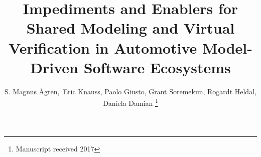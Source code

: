 \documentclass[10pt,journal,compsoc,letterpaper]{IEEEtran}
\begin{document}
%
\title{Impediments and Enablers for Shared Modeling and Virtual Verification in Automotive Model-Driven Software Ecosystems}
%
%
%

\author{S. Magnus Ågren,~Eric Knauss, Paolo Giusto, Grant Soremekun, Rogardt Heldal, Daniela Damian%
\thanks{Manuscript received 2017}}
% 
%
\end{document}
